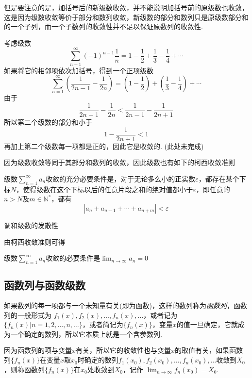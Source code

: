 但是要注意的是，加括号后的新级数收敛，并不能说明加括号前的原级数也收敛，这是因为级数收敛等价于部分和数列收敛，新级数的部分和数列只是原级数部分和的一个子列，而一个子数列的收敛性并不足以保证原数列的收敛性.

\begin{example}
  考虑级数
  \[ \sum_{n-1}^{\infty}(-1)^{n-1} \frac{1}{n} = 1-\frac{1}{2}+\frac{1}{3}-\frac{1}{4}+\cdots \]
  如果将它的相邻项依次加括号，得到一个正项级数
  \[ \sum_{n=1}^{\infty} \left( \frac{1}{2n-1}-\frac{1}{2n} \right) = \left( 1-\frac{1}{2} \right) + \left( \frac{1}{3} - \frac{1}{4} \right) + \cdots \]
  由于
  \[  \frac{1}{2n-1}-\frac{1}{2n} < \frac{1}{2n-1} - \frac{1}{2n+1} \]
  所以第二个级数的部分和小于
  \[ 1-\frac{1}{2n+1} < 1 \]
  再加上第二个级数每一项都是正的，因此它是收敛的.
  (此处未完成)
\end{example}

因为级数收敛等同于其部分和数列的收敛，因此级数也有如下的柯西收敛准则
\begin{theorem}
  级数$\sum_{n=1}^{\infty}a_n$收敛的充分必要条件是，对于无论多么小的正实数$\varepsilon$，都存在某个下标$N$，使得级数在这个下标以后的任意片段之和的绝对值都小于$\varepsilon$，即任意的$n>N$及$m\in \mathbb{N^{*}}$，都有
  \[ |a_{n}+a_{n+1}+\cdots+a_{n+m}|<\varepsilon \]
\end{theorem}

\begin{example}
  调和级数的发散性
\end{example}

由柯西收敛准则可得
\begin{theorem}
 级数$\sum_{n=1}^{\infty}a_n$收敛的必要条件是$\lim_{n\to\infty}a_n=0$ 
\end{theorem}

\subsection{函数列与函数级数}
\label{sec:sequene-of-function-and-function-series}

如果数列的每一项都与一个未知量有关(即为函数)，这样的数列称为\emph{函数列}，函数列的一般形式为 $f_1(x),f_2(x),\ldots,f_{n}(x),\ldots$，或者记为$\{f_n(x)|n=1,2,\ldots,n,\ldots\}$，或者简记为$\{ f_n(x) \}$，变量$x$的值一旦确定，它就成为一个确定的数列，所以它本质上就是一个含参数列.

因为函数列的项与变量$x$有关，所以它的收敛性也与变量$x$的取值有关，如果函数列$\{ f_{n}(x)\}$在变量$x$取$x_0$时确定的数列$f_1(x_0),f_2(x_0),\ldots,f_n(x_0),\ldots$收敛到$X_0$，则称函数列$\{f_n(x)\}$在$x_0$处收敛到$X_0$，记作 $\lim_{n\to\infty}f_n(x_0)=X_0$.

